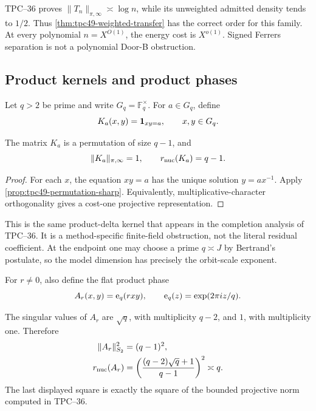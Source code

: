 TPC--36 proves \(\|T_n\|_{\pi,\infty}\asymp\log n\), while its
unweighted admitted density tends to \(1/2\).  Thus
\cref{thm:tpc49-weighted-transfer} has the correct order for this
family.  At every polynomial \(n=X^{O(1)}\), the energy cost is
\(X^{o(1)}\).  Signed Ferrers separation is not a polynomial Door-B
obstruction.

\subsection{Product kernels and product phases}

Let \(q>2\) be prime and write \(G_q=\mathbb F_q^\times\).  For
\(a\in G_q\), define
\begin{equation}
 K_a(x,y)=\mathbf 1_{xy=a},
 \qquad x,y\in G_q.
 \label{eq:tpc49-product-kernel}
\end{equation}

\begin{proposition}
\label{prop:tpc49-product-permutation}
The matrix \(K_a\) is a permutation of size \(q-1\), and
\begin{equation}
 \|K_a\|_{\pi,\infty}=1,
 \qquad
 r_{\rm nuc}(K_a)=q-1.
 \label{eq:tpc49-product-permutation-data}
\end{equation}
\end{proposition}

\begin{proof}
For each \(x\), the equation \(xy=a\) has the unique solution
\(y=ax^{-1}\).  Apply \cref{prop:tpc49-permutation-sharp}.  Equivalently,
multiplicative-character orthogonality gives a cost-one projective
representation.
\end{proof}

This is the same product-delta kernel that appears in the completion
analysis of TPC--36.  It is a method-specific finite-field obstruction,
not the literal residual coefficient.
At the endpoint one may choose a prime \(q\asymp J\) by Bertrand's
postulate, so the model dimension has precisely the orbit-scale exponent.

For \(r\ne0\), also define the flat product phase
\begin{equation}
 A_r(x,y)=\mathrm e_q(rxy),
 \qquad \mathrm e_q(z)=\exp(2\pi iz/q).
 \label{eq:tpc49-product-phase}
\end{equation}

\begin{proposition}
\label{prop:tpc49-product-phase}
The singular values of \(A_r\) are \(\sqrt q\), with multiplicity
\(q-2\), and \(1\), with multiplicity one.  Therefore
\begin{align}
 \|A_r\|_{S_2}^2&=(q-1)^2,
 \label{eq:tpc49-product-phase-Frobenius}\\
 r_{\rm nuc}(A_r)
 &=\left(
 \frac{(q-2)\sqrt q+1}{q-1}
 \right)^2\asymp q.
 \label{eq:tpc49-product-phase-rank}
\end{align}
The last displayed square is exactly the square of the bounded
projective norm computed in TPC--36.
\end{proposition}

